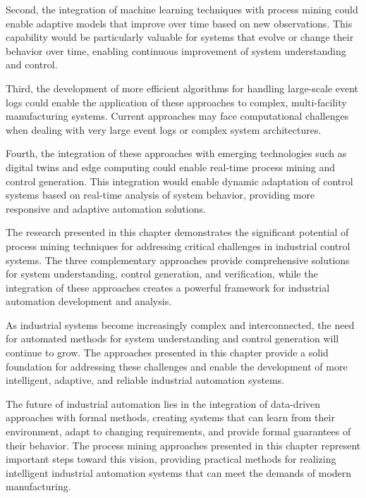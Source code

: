 Second, the integration of machine learning techniques with process mining could enable adaptive models that improve over time based on new observations. This capability would be particularly valuable for systems that evolve or change their behavior over time, enabling continuous improvement of system understanding and control.

Third, the development of more efficient algorithms for handling large-scale event logs could enable the application of these approaches to complex, multi-facility manufacturing systems. Current approaches may face computational challenges when dealing with very large event logs or complex system architectures.

Fourth, the integration of these approaches with emerging technologies such as digital twins and edge computing could enable real-time process mining and control generation. This integration would enable dynamic adaptation of control systems based on real-time analysis of system behavior, providing more responsive and adaptive automation solutions.

The research presented in this chapter demonstrates the significant potential of process mining techniques for addressing critical challenges in industrial control systems. The three complementary approaches provide comprehensive solutions for system understanding, control generation, and verification, while the integration of these approaches creates a powerful framework for industrial automation development and analysis.

As industrial systems become increasingly complex and interconnected, the need for automated methods for system understanding and control generation will continue to grow. The approaches presented in this chapter provide a solid foundation for addressing these challenges and enable the development of more intelligent, adaptive, and reliable industrial automation systems.

The future of industrial automation lies in the integration of data-driven approaches with formal methods, creating systems that can learn from their environment, adapt to changing requirements, and provide formal guarantees of their behavior. The process mining approaches presented in this chapter represent important steps toward this vision, providing practical methods for realizing intelligent industrial automation systems that can meet the demands of modern manufacturing.
